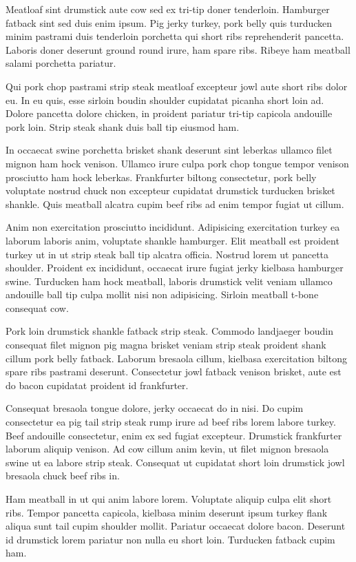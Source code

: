 Meatloaf sint drumstick aute cow sed ex tri-tip doner tenderloin. Hamburger fatback sint sed duis enim ipsum. Pig jerky turkey, pork belly quis turducken minim pastrami duis tenderloin porchetta qui short ribs reprehenderit pancetta. Laboris doner deserunt ground round irure, ham spare ribs. Ribeye ham meatball salami porchetta pariatur.

Qui pork chop pastrami strip steak meatloaf excepteur jowl aute short ribs dolor eu. In eu quis, esse sirloin boudin shoulder cupidatat picanha short loin ad. Dolore pancetta dolore chicken, in proident pariatur tri-tip capicola andouille pork loin. Strip steak shank duis ball tip eiusmod ham.

In occaecat swine porchetta brisket shank deserunt sint leberkas ullamco filet mignon ham hock venison. Ullamco irure culpa pork chop tongue tempor venison prosciutto ham hock leberkas. Frankfurter biltong consectetur, pork belly voluptate nostrud chuck non excepteur cupidatat drumstick turducken brisket shankle. Quis meatball alcatra cupim beef ribs ad enim tempor fugiat ut cillum.

Anim non exercitation prosciutto incididunt. Adipisicing exercitation turkey ea laborum laboris anim, voluptate shankle hamburger. Elit meatball est proident turkey ut in ut strip steak ball tip alcatra officia. Nostrud lorem ut pancetta shoulder. Proident ex incididunt, occaecat irure fugiat jerky kielbasa hamburger swine. Turducken ham hock meatball, laboris drumstick velit veniam ullamco andouille ball tip culpa mollit nisi non adipisicing. Sirloin meatball t-bone consequat cow.

Pork loin drumstick shankle fatback strip steak. Commodo landjaeger boudin consequat filet mignon pig magna brisket veniam strip steak proident shank cillum pork belly fatback. Laborum bresaola cillum, kielbasa exercitation biltong spare ribs pastrami deserunt. Consectetur jowl fatback venison brisket, aute est do bacon cupidatat proident id frankfurter.

Consequat bresaola tongue dolore, jerky occaecat do in nisi. Do cupim consectetur ea pig tail strip steak rump irure ad beef ribs lorem labore turkey. Beef andouille consectetur, enim ex sed fugiat excepteur. Drumstick frankfurter laborum aliquip venison. Ad cow cillum anim kevin, ut filet mignon bresaola swine ut ea labore strip steak. Consequat ut cupidatat short loin drumstick jowl bresaola chuck beef ribs in.

Ham meatball in ut qui anim labore lorem. Voluptate aliquip culpa elit short ribs. Tempor pancetta capicola, kielbasa minim deserunt ipsum turkey flank aliqua sunt tail cupim shoulder mollit. Pariatur occaecat dolore bacon. Deserunt id drumstick lorem pariatur non nulla eu short loin. Turducken fatback cupim ham.

